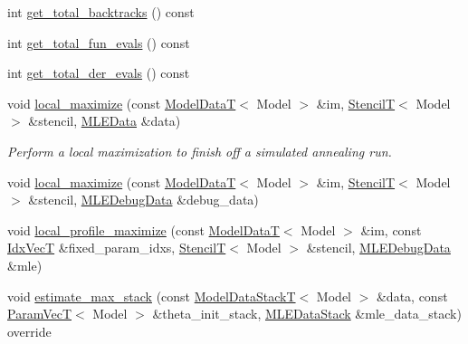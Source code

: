 \begin{DoxyCompactItemize}
int \hyperlink{classmappel_1_1estimator_1_1IterativeMaximizer_a5b689ae57a9f2bf64739fab6d32ca74b}{get\+\_\+total\+\_\+backtracks} () const 
\item 
int \hyperlink{classmappel_1_1estimator_1_1IterativeMaximizer_a4ab922cd52088ae3e940e4f0d6fac066}{get\+\_\+total\+\_\+fun\+\_\+evals} () const 
\item 
int \hyperlink{classmappel_1_1estimator_1_1IterativeMaximizer_aa522c84aaaa2b745b3112e9fd2cf4fc9}{get\+\_\+total\+\_\+der\+\_\+evals} () const 
\item 
void \hyperlink{classmappel_1_1estimator_1_1IterativeMaximizer_a35bda016bda047cdd6816ed1a8f76d30}{local\+\_\+maximize} (const \hyperlink{namespacemappel_a97f050df953605381ae9c901c3b125f1}{Model\+DataT}$<$ Model $>$ \&im, \hyperlink{namespacemappel_a3a06598240007876f8c4bf834ad86197}{StencilT}$<$ Model $>$ \&stencil, \hyperlink{namespacemappel_1_1estimator_structmappel_1_1estimator_1_1MLEData}{M\+L\+E\+Data} \&data)
\begin{DoxyCompactList}\small\item\em Perform a local maximization to finish off a simulated annealing run. \end{DoxyCompactList}\item 
void \hyperlink{classmappel_1_1estimator_1_1IterativeMaximizer_a2fd6152953dcc530a23350dcc93baf7c}{local\+\_\+maximize} (const \hyperlink{namespacemappel_a97f050df953605381ae9c901c3b125f1}{Model\+DataT}$<$ Model $>$ \&im, \hyperlink{namespacemappel_a3a06598240007876f8c4bf834ad86197}{StencilT}$<$ Model $>$ \&stencil, \hyperlink{namespacemappel_1_1estimator_structmappel_1_1estimator_1_1MLEDebugData}{M\+L\+E\+Debug\+Data} \&debug\+\_\+data)
\item 
void \hyperlink{classmappel_1_1estimator_1_1IterativeMaximizer_acc71726ed0876fd59ce3b07ea9950625}{local\+\_\+profile\+\_\+maximize} (const \hyperlink{namespacemappel_a97f050df953605381ae9c901c3b125f1}{Model\+DataT}$<$ Model $>$ \&im, const \hyperlink{namespacemappel_ac63743dcd42180127307cd0e4ecdd784}{Idx\+VecT} \&fixed\+\_\+param\+\_\+idxs, \hyperlink{namespacemappel_a3a06598240007876f8c4bf834ad86197}{StencilT}$<$ Model $>$ \&stencil, \hyperlink{namespacemappel_1_1estimator_structmappel_1_1estimator_1_1MLEDebugData}{M\+L\+E\+Debug\+Data} \&mle)
\item 
void \hyperlink{classmappel_1_1estimator_1_1ThreadedEstimator_a797b6479fbab450a42099cfdb07e900f}{estimate\+\_\+max\+\_\+stack} (const \hyperlink{namespacemappel_aaeb6665bc57476dd93c2df6ad8bc4768}{Model\+Data\+StackT}$<$ Model $>$ \&data, const \hyperlink{namespacemappel_a0f86d3153e4e27b095012f140eea58de}{Param\+VecT}$<$ Model $>$ \&theta\+\_\+init\+\_\+stack, \hyperlink{namespacemappel_1_1estimator_structmappel_1_1estimator_1_1MLEDataStack}{M\+L\+E\+Data\+Stack} \&mle\+\_\+data\+\_\+stack) override

\end{DoxyCompactItemize}
